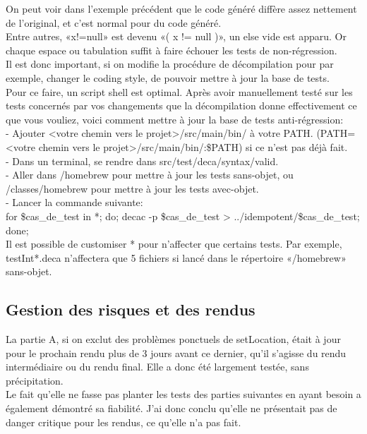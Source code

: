 \documentclass[a4paper]{article}
\begin{document}
On peut voir dans l'exemple précédent que le code généré diffère assez nettement de l'original, et c'est normal pour du code généré.\\

Entre autres, «x!=null» est devenu «( x != null )», un else vide est apparu. Or chaque espace ou tabulation suffit à faire échouer les tests de non-régression. \\

Il est donc important, si on modifie la procédure de décompilation pour par exemple, changer le coding style, de pouvoir mettre à jour la base de tests.\\

Pour ce faire, un script shell est optimal. Après avoir manuellement testé sur les tests concernés par vos changements que la décompilation donne effectivement ce que vous vouliez, voici comment mettre à jour la base de tests anti-régression:\\

- Ajouter <votre chemin vers le projet>/src/main/bin/ à votre PATH. (PATH=<votre chemin vers le projet>/src/main/bin/:\$PATH) si ce n'est pas déjà fait.\\
- Dans un terminal, se rendre dans src/test/deca/syntax/valid.\\
- Aller dans /homebrew pour mettre à jour les tests sans-objet, ou /classes/homebrew pour mettre à jour les tests avec-objet.\\
- Lancer la commande suivante:\\
for \$cas\_de\_test in *; do; decac -p \$cas\_de\_test > ../idempotent/\$cas\_de\_test; done;\\

Il est possible de customiser * pour n'affecter que certains tests. Par exemple, testInt*.deca n'affectera que 5 fichiers si lancé dans le répertoire «/homebrew» sans-objet. \\

\subsection{Gestion des risques et des rendus}

La partie A, si on exclut des problèmes ponctuels de setLocation, était à jour pour le prochain rendu plus de 3 jours avant ce dernier, qu'il s'agisse du rendu intermédiaire ou du rendu final. Elle a donc été largement testée, sans précipitation.\\

Le fait qu'elle ne fasse pas planter les tests des parties suivantes en ayant besoin a également démontré sa fiabilité. J'ai donc conclu qu'elle ne présentait pas de danger critique pour les rendus, ce qu'elle n'a pas fait.\\
\end{document}
